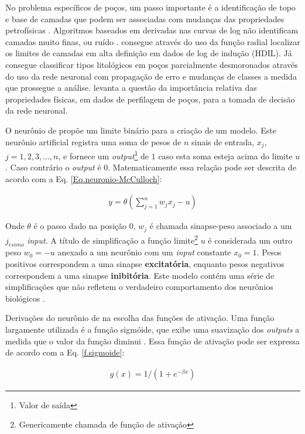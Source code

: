 No problema específicos de poços, um passo importante é a identificação de topo e base de camadas que podem ser associadas com mudanças das propriedades petrofísicas \citep{Saljooghi2014}. Algoritmos baseados em derivadas nas curvas de log não identificam camadas muito finas, ou ruído \citep{Zhang1999}. \citet{Chakravarthy1999} consegue através do uso da função radial localizar os limites de camadas em alta definição em dados de log de indução (HDIL). Já \citet{Benaouda1999} consegue classificar tipos litológicos em poços parcialmente desmoronados através do uso da rede neuronal com propagação de erro e mudanças de classes a medida que prossegue a análise. \citet{Gloaguen2017} levanta a questão da importância relativa das propriedades físicas, em dados de perfilagem de poços,  para a tomada de decisão da rede neuronal.

O neurônio de \citet{McCulloch1943} propõe um limite binário para a criação de um modelo. Este neurônio artificial registra uma soma de pesos de $n$ sinais de entrada, $x_{j}$, $j=1,2,3,...,n$, e fornece um \textit{output}\footnote{Valor de saída} de $1$ caso esta soma esteja acima do limite $u$. Caso contrário o \textit{output} é $0$. Matematicamente essa relação pode ser descrita de acordo com a Eq. \ref{Eq.neuronio-McCulloch}:

\begin{eqnarray}
y=\theta \left( \sum^{n}_{j=1} w_{j} x_{j} -u \right)
\label{Eq.neuronio-McCulloch}
\end{eqnarray}

Onde $\theta$ é o passo dado na posição $0$, $w_{j}$ é chamada sinapse-peso associado a um $j_{esimo}$ \textit{input}. A título de simplificação a função limite\footnote{Genericamente chamada de função de ativação} $u$ é considerada um outro peso $w_{0}=-u$ anexado a um neurônio com um \textit{input} constante $x_{0}=1$. Pesos positivos correspondem a uma sinapse \textbf{excitatória}, enquanto pesos negativos correspondem a uma sinapse \textbf{inibitória}. Este modelo contém uma série de simplificações que não refletem o verdadeiro comportamento dos neurônios biológicos \citep{Mao1996}.  

Derivações do neurônio de \citet{McCulloch1943} na escolha das funções de ativação. Uma função largamente utilizada é a função sigmóide, que exibe uma suavização dos \textit{outputs} a medida que o valor da função diminui \citep{Mao1996,Misra2010}. Essa função de ativação pode ser expressa de acordo com a Eq. \ref{f.sigmoide}:

\begin{eqnarray}
g(x)=1/(1+e^{-\beta x})
\label{f.sigmoide}
\end{eqnarray}

